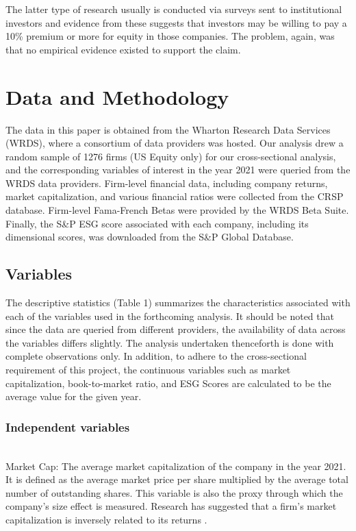 \documentclass[man,natbib,floatsintext]{apa6}
\begin{document}
The latter type of research usually is conducted via surveys sent to institutional investors and evidence from these suggests that investors may be willing to pay a 10\% premium or more for equity in those companies. The problem, again, was that no empirical evidence existed to support the claim. 



\section{\textbf{Data and Methodology}}

The data in this paper is obtained from the Wharton Research Data Services (WRDS), where a consortium of data providers was hosted. Our analysis drew a random sample of 1276 firms (US Equity only) for our cross-sectional analysis, and the corresponding variables of interest in the year 2021 were queried from the WRDS data providers. Firm-level financial data, including company returns, market capitalization, and various financial ratios were collected from the CRSP database. Firm-level Fama-French Betas were provided by the WRDS Beta Suite. Finally, the S\&P ESG score associated with each company, including its dimensional scores, was downloaded from the S\&P Global Database.


\subsection{\textbf{Variables}}

The descriptive statistics (Table 1) summarizes the characteristics associated with each of the variables used in the forthcoming analysis. It should be noted that since the data are queried from different providers, the availability of data across the variables differs slightly. The analysis undertaken thenceforth is done with complete observations only. In addition, to adhere to the cross-sectional requirement of this project, the continuous variables such as market capitalization, book-to-market ratio, and ESG Scores are calculated to be the average value for the given year. 

\subsubsection{{Independent variables}} \hfill\\


Market Cap: The average market capitalization of the company in the year 2021. It is defined as the average market price per share multiplied by the average total number of outstanding shares. This variable is also the proxy through which the company's size effect is measured. Research has suggested that a firm's market capitalization is inversely related to its returns \citep{banz_1981, fama_french_1993}.
\end{document}
